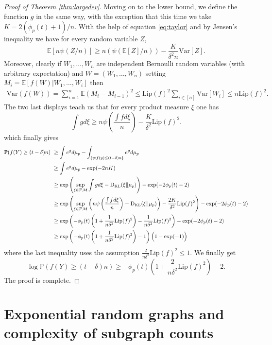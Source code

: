 \documentclass[12pt]{article}
\def \EE {\mathbb E}
\def \PP {\mathbb P}
\def \Lip {\mathrm {Lip}}
\def \KL {\mathrm{D}_{\mathrm{KL}}}
\theoremstyle{definition}
\theoremstyle{remark}
\begin{document}
\begin{proof} [Proof of Theorem \ref{thm:largedev}]
	Moving on to the lower bound, we define the function $g$ in the same way, with the exception that this time we take $K = 2 (\phi_p(t)+1)/n$. With the help of equation \eqref{eq:taylor} and by Jensen's inequality we have for every random variable $Z$,
	$$
	\EE \left [n \psi (Z / n) \right ] \geq n ( \psi(\EE[Z] / n)) - \frac{K}{\delta^2 n} \mathrm{Var}[Z].
	$$	
	Moreover, clearly if $W_1,\dots,W_n$ are independent Bernoulli random variables (with arbitrary expectation) and $W=(W_1,\dots,W_n)$ setting $M_i = \EE[f(W) | W_1,\dots,W_i]$ then
	\begin{align*}
	\mathrm{Var}(f(W)) = \sum_{i=1}^n \EE (M_{i}-M_{i-1})^2 \leq \Lip(f)^2 \sum_{i \in [n]} \mathrm{Var}[W_i] \leq n \Lip(f)^2.
	\end{align*}
	The two last displays teach us that for every product measure $\xi$ one has
	$$
	\int g d \xi \geq n \psi \left ( \frac{\int f d \xi} {n} \right ) - \frac{K}{\delta^2 } \Lip(f)^2.
	$$
	which finally gives
	\begin{align*}
	\PP(f(Y) \geq (t - \delta) n) ~& \geq \int e^g d \mu_p - \int_{\{y: f(y) \leq (t-\delta) n \} } e^{g} d \mu_p  \\
	& \geq \int e^g d \mu_p - \exp(-2 n K) \\
	& \geq \exp \left (\sup_{\xi \in \mathcal{PM}} \int g d \xi - \KL(\xi \Vert \mu_p)\right ) - \exp(- 2\phi_p(t) - 2) \\
	& \geq \exp \left (\sup_{\xi \in \mathcal{PM}} \left ( n \psi \left ( \frac{\int f d \xi} {n} \right ) - \KL(\xi \Vert \mu_p) \right ) - \frac{2 K}{\delta^2 } \Lip(f)^2 \right ) - \exp(-2\phi_p(t)-2) \\ 
	& \geq \exp \left (-\phi_p(t) \left ( 1 + \frac{1}{n \delta^2 } \Lip(f)^2 \right ) - \frac{1}{n \delta^2} \Lip(f)^2  \right ) - \exp(- 2\phi_p(t)-2) \\
	& \geq \exp \left (-\phi_p(t) \left ( 1 + \frac{1}{n \delta^2 } \Lip(f)^2 \right ) - 1 \right ) \Bigl (1 - \exp(-1) \Bigr )
	\end{align*}
	where the last inequality uses the assumption $\frac{2}{n \delta^2 } \Lip(f)^2 \leq 1$. We finally get
	$$
	\log \PP(f(Y) \geq (t - \delta) n) \geq -\phi_p(t) \left ( 1 + \frac{2}{n \delta^2 } \Lip(f)^2 \right ) - 2.
	$$
	The proof is complete.	
\end{proof}

\section{Exponential random graphs and complexity of subgraph counts}
\end{document}
